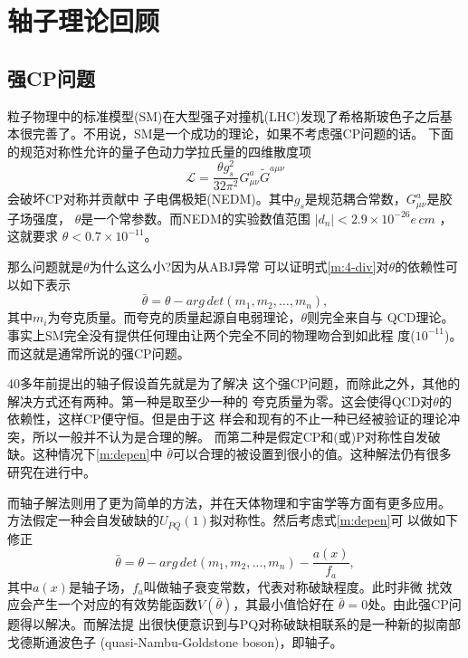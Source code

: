 \documentclass[twocolumn,12pt,a4paper]{article}
\begin{document}
\section{轴子理论回顾}
\subsection{强CP问题}
粒子物理中的标准模型(SM)在大型强子对撞机(LHC)发现了希格斯玻色子之后基
本很完善了。不用说，SM是一个成功的理论，如果不考虑强CP问题的话。
下面的规范对称性允许的量子色动力学拉氏量的四维散度项
\begin{equation}
  \mathcal{L} = \frac{\theta g_s^2}{32\pi^2}G_{\mu\nu}^a\tilde{G}^{a\mu\nu}
  \label{m:4-div}
\end{equation}
会破坏CP对称并贡献中
子电偶极矩(NEDM)。其中$g_s$是规范耦合常数，$G_{\mu\nu}^a$是胶子场强度，
$\theta$是一个常参数。而NEDM的实验数值范围
$|d_n|<2.9 \times 10^{-26} e\, cm$ \cite{baker06}，这就要求
$\theta<0.7\times10^{-11}$\cite{kim10}。\par
那么问题就是$\theta$为什么这么小?因为从ABJ异常
\cite{adler69}\cite{bell69}可以证明式\ref{m:4-div}对$\theta$的依赖性可
以如下表示
\begin{equation}
  \bar{\theta} = \theta - arg \, det(m_1,m_2, \ldots, m_n),
  \label{m:depen}
\end{equation}
其中$m_i$为夸克质量。而夸克的质量起源自电弱理论，$\theta$则完全来自与
QCD理论。事实上SM完全没有提供任何理由让两个完全不同的物理吻合到如此程
度($10^{-11}$)。而这就是通常所说的强CP问题。\par
40多年前提出的轴子假设\cite{peccei77}首先就是为了解决
这个强CP问题，而除此之外，其他的解决方式还有两种。第一种是取至少一种的
夸克质量为零。这会使得QCD对$\theta$的依赖性，这样CP便守恒。但是由于这
样会和现有的不止一种已经被验证的理论冲突，所以一般并不认为是合理的解。
而第二种是假定CP和(或)P对称性自发破缺。这种情况下\ref{m:depen}中
$\bar{\theta}$可以合理的被设置到很小的值。这种解法仍有很多研究在进行中。\par
而轴子解法则用了更为简单的方法，并在天体物理和宇宙学等方面有更多应用。
方法假定一种会自发破缺的$U_{PQ}(1)$拟对称性。然后考虑式\ref{m:depen}可
以做如下修正
\begin{equation}
  \bar{\theta} = \theta - arg \, det(m_1,m_2, \ldots, m_n)- \frac{a(x)}{f_a},
  \label{m:modd}
\end{equation}
其中$a(x)$是轴子场，$f_a$叫做轴子衰变常数，代表对称破缺程度。此时非微
扰效应会产生一个对应的有效势能函数$V(\bar{\theta})$，其最小值恰好在
$\bar{\theta}=0$处\cite{vefa84}。由此强CP问题得以解决。而解法提
出很快便意识到与PQ对称破缺相联系的是一种新的拟南部戈德斯通波色子
(quasi-Nambu-Goldstone boson)，即轴子\cite{weinberg78}\cite{wilczek78}。
\end{document}
